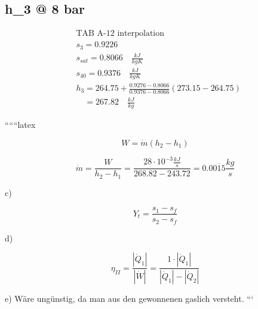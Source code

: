 \subsection*{h_3 @ 8 bar}
\begin{align*}
    &\text{TAB A-12 interpolation} \\
    &s_3 = 0.9226 \\
    &s_{sat} = 0.8066 \quad \frac{kJ}{kgK} \\
    &s_{40} = 0.9376 \quad \frac{kJ}{kgK} \\
    &h_3 = 264.75 + \frac{0.9276 - 0.8066}{0.9376 - 0.8066} (273.15 - 264.75) \\
    &\quad = 267.82 \quad \frac{kJ}{kg}
\end{align*}

``````latex


\[
W = \dot{m} (h_2 - h_1)
\]

\[
\dot{m} = \frac{W}{h_2 - h_1} = \frac{28 \cdot 10^{-3} \frac{kJ}{s}}{268.82 - 243.72} = 0.00 \overline{1}5 \frac{kg}{s}
\]

c)

\[
Y_t = \frac{s_1 - s_f}{s_2 - s_f}
\]

d)

\[
\eta_{II} = \frac{| \dot{Q}_1 |}{| \dot{W} |} = \frac{1 \cdot | \dot{Q}_1 |}{| \dot{Q}_1 | - | \dot{Q}_2 |}
\]

e) Wäre ungünstig, da man aus den gewonnenen gaslich versteht.
```